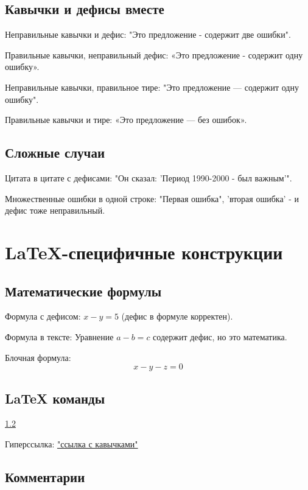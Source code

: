 \documentclass[12pt,a4paper]{article}
\begin{document}
\subsection{Кавычки и дефисы вместе}

Неправильные кавычки и дефис: "Это предложение - содержит две ошибки".

Правильные кавычки, неправильный дефис: «Это предложение - содержит одну ошибку».

Неправильные кавычки, правильное тире: "Это предложение — содержит одну ошибку".

Правильные кавычки и тире: «Это предложение — без ошибок».

\subsection{Сложные случаи}

Цитата в цитате с дефисами: "Он сказал: 'Период 1990-2000 - был важным'".

Множественные ошибки в одной строке: "Первая ошибка", 'вторая ошибка' - и дефис тоже неправильный.

\section{LaTeX-специфичные конструкции}

\subsection{Математические формулы}

Формула с дефисом: $x - y = 5$ (дефис в формуле корректен).

Формула в тексте: Уравнение $a-b=c$ содержит дефис, но это математика.

Блочная формула:
\[
x - y - z = 0
\]

\subsection{LaTeX команды}

\label{test-section}
\ref{test-section}

Гиперссылка: \href{http://example.com}{"ссылка с кавычками"}

\subsection{Комментарии}
\end{document}
